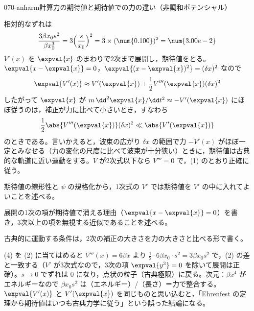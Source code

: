 \documentclass[uplatex,dvipdfmx,a4paper,11pt]{jsarticle}
\begin{document}
\begin{mondai}{070-anharm}{計算}{力の期待値と期待値での力の違い（非調和ポテンシャル）}
\begin{tadashii}
 相対的なずれは
\[ \frac{3\beta x_{0}s^{2}}{\beta x_{0}^{3}}=3\Bigl(\frac{s}{x_{0}}\Bigr)^{2}=3\times(\num{0.100})^{2}=\num{3.00e-2} \]
 $V'(x)$ を $\expval{x}$ のまわりで2次まで展開し，期待値をとる。$\expval{x-\expval{x}}=0$，$\expval{(x-\expval{x})^{2}}=(\delta x)^{2}$ なので
\[ \expval{V'(x)}\approx V'(\expval{x})+\frac{1}{2}V'''(\expval{x})(\delta x)^{2} \]
したがって $\expval{x}$ が $m\,\dd^{2}\expval{x}/\dd t^{2}\approx-V'(\expval{x})$ にほぼ従うのは，補正が力に比べて小さいとき，すなわち
\[ \frac{1}{2}\abs{V'''(\expval{x})}(\delta x)^{2}\ll\abs{V'(\expval{x})} \]
のときである。言いかえると，波束の広がり $\delta x$ の範囲で力 $-V'(x)$ がほぼ一定とみなせる（力の変化の尺度に比べて波束が十分狭い）ときに，期待値は古典的な軌道に近い運動をする。$V$ が2次式以下なら $V'''=0$ で，(1) のとおり正確に従う。
\begin{ronten}
  \item {} 期待値の線形性と $\psi$ の規格化から，1次式の $V'$ では期待値を $V'$ の中に入れてよいことを述べる。
  \item {} 展開の1次の項が期待値で消える理由（$\expval{x-\expval{x}}=0$）を書き，3次以上の項を無視する近似であることを述べる。
  \item {} 古典的に運動する条件は，2次の補正の大きさを力の大きさと比べる形で書く。
\end{ronten}
\kenzan (4) を (2) に当てはめると $V'''(x)=6\beta x$ より $\frac{1}{2}\cdot6\beta x_{0}\cdot s^{2}=3\beta x_{0}s^{2}$ で，(2) の差と一致する（$V'$ が3次式なので，3次の項 $\expval{y^{3}}=0$ を除いて展開は正確）。$s\to0$ でずれは $0$ になり，点状の粒子（古典極限）に戻る。次元：$\beta x^{4}$ がエネルギーなので $\beta x_{0}s^{2}$ は（エネルギー）/（長さ）＝力で整合する。
\tsumazuki $\expval{V'(x)}$ と $V'(\expval{x})$ を同じものと思い込むと，「Ehrenfest の定理から期待値はいつも古典力学に従う」という誤った結論になる。
\end{tadashii}
\end{mondai}
\end{document}

